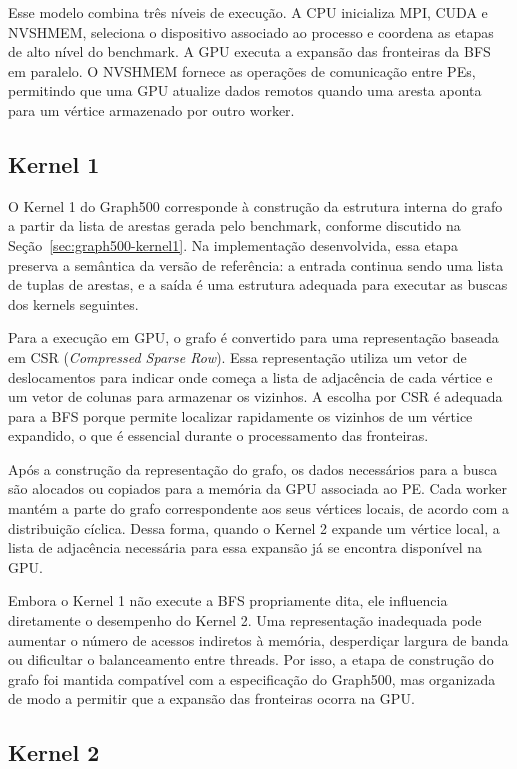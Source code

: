 Esse modelo combina três níveis de execução. A CPU inicializa MPI, CUDA e
NVSHMEM, seleciona o dispositivo associado ao processo e coordena as etapas de
alto nível do benchmark. A GPU executa a expansão das fronteiras da BFS em
paralelo. O NVSHMEM fornece as operações de comunicação entre PEs, permitindo que
uma GPU atualize dados remotos quando uma aresta aponta para um vértice
armazenado por outro worker.

\subsection{Kernel 1}

O Kernel 1 do Graph500 corresponde à construção da estrutura interna do grafo a
partir da lista de arestas gerada pelo benchmark, conforme discutido na
Seção~\ref{sec:graph500-kernel1}. Na implementação desenvolvida, essa etapa
preserva a semântica da versão de referência: a entrada continua sendo uma lista
de tuplas de arestas, e a saída é uma estrutura adequada para executar as buscas
dos kernels seguintes.

Para a execução em GPU, o grafo é convertido para uma representação baseada em
CSR (\textit{Compressed Sparse Row}). Essa representação utiliza um vetor de
deslocamentos para indicar onde começa a lista de adjacência de cada vértice e um
vetor de colunas para armazenar os vizinhos. A escolha por CSR é adequada para a
BFS porque permite localizar rapidamente os vizinhos de um vértice expandido, o
que é essencial durante o processamento das fronteiras.

Após a construção da representação do grafo, os dados necessários para a busca
são alocados ou copiados para a memória da GPU associada ao PE. Cada worker
mantém a parte do grafo correspondente aos seus vértices locais, de acordo com a
distribuição cíclica. Dessa forma, quando o Kernel 2 expande um vértice local, a
lista de adjacência necessária para essa expansão já se encontra disponível na
GPU.

Embora o Kernel 1 não execute a BFS propriamente dita, ele influencia diretamente
o desempenho do Kernel 2. Uma representação inadequada pode aumentar o número de
acessos indiretos à memória, desperdiçar largura de banda ou dificultar o
balanceamento entre threads. Por isso, a etapa de construção do grafo foi mantida
compatível com a especificação do Graph500, mas organizada de modo a permitir que
a expansão das fronteiras ocorra na GPU.

\subsection{Kernel 2}

